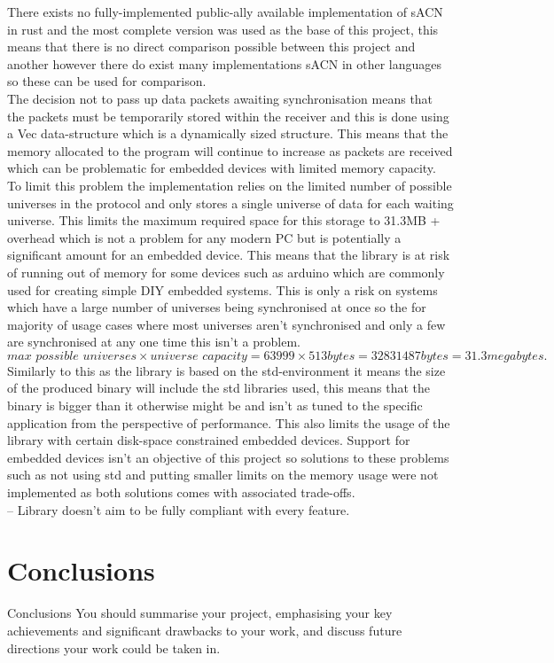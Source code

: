 \documentclass[11pt,a4paper]{report}
\begin{document}
	There exists no fully-implemented public-ally available implementation of sACN in rust and the most complete version was used as the base of this project, this means that there is no direct comparison possible between this project and another however there do exist many implementations sACN in other languages so these can be used for comparison. \\
	
	
	The decision not to pass up data packets awaiting synchronisation means that the packets must be temporarily stored within the receiver and this is done using a Vec data-structure which is a dynamically sized structure. This means that the memory allocated to the program will continue to increase as packets are received which can be problematic for embedded devices with limited memory capacity. To limit this problem the implementation relies on the limited number of possible universes in the protocol and only stores a single universe of data for each waiting universe. This limits the maximum required space for this storage to 31.3MB + overhead which is not a problem for any modern PC but is potentially a significant amount for an embedded device. This means that the library is at risk of running out of memory for some devices such as arduino \cite{ARDUINO} which are commonly used for creating simple DIY embedded systems. This is only a risk on systems which have a large number of universes being synchronised at once so the for majority of usage cases where most universes aren't synchronised and only a few are synchronised at any one time this isn't a problem.
	\[ 
	\textit{max possible universes} \times \textit{universe capacity} = 63999 \times 513 bytes = 32831487 bytes = 31.3 megabytes. 
	\]
	Similarly to this as the library is based on the std-environment it means the size of the produced binary will include the std libraries used, this means that the binary is bigger than it otherwise might be and isn't as tuned to the specific application from the perspective of performance. This also limits the usage of the library with certain disk-space constrained embedded devices. Support for embedded devices isn't an objective of this project so solutions to these problems such as not using std and putting smaller limits on the memory usage were not implemented as both solutions comes with associated trade-offs.\\
	
	
-- Library doesn't aim to be fully compliant with every feature.	
	
	\section{Conclusions}
	Conclusions
	You should summarise your project, emphasising your
	key achievements and significant drawbacks to your
	work, and discuss future directions your work could be
	taken in.
	
\end{document}
